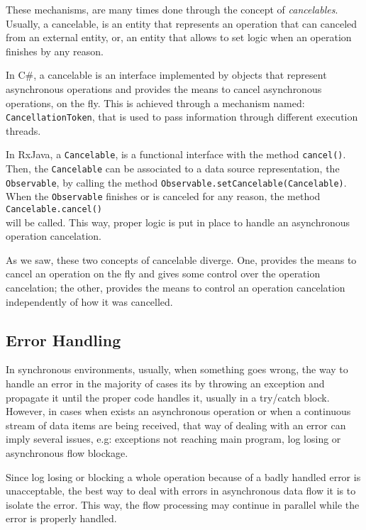 	These mechanisms, are many times done through the concept of \textit{cancelables}. 
	Usually, a cancelable, is an entity that represents an operation that can canceled from an external entity, or, an entity that allows to set logic when an operation finishes by any reason.
 
	In C\#, a cancelable is an interface implemented by objects that represent asynchronous operations and provides the means to cancel asynchronous operations, on the fly. 
	This is achieved through a mechanism named: \texttt{CancellationToken}, that is used to pass information through different execution threads. 
	
	In RxJava, a \texttt{Cancelable}, is a functional interface with the method \texttt{cancel()}. Then, the \texttt{Cancelable} can be associated to a data source representation, the \texttt{Observable}, by calling the method \texttt{Observable.setCancelable(Cancelable)}. 
	When the \texttt{Observable} finishes or is canceled for any reason, the method \texttt{Cancelable.cancel()}\\ will be called. 
	This way,  proper logic is put in place to handle an asynchronous operation cancelation.
	
	As we saw, these two concepts of cancelable diverge. One, provides the means to cancel an operation on the fly and gives some control over the operation cancelation; the other, provides the means to control an operation cancelation independently of how it was cancelled.
	
	\clearpage
	\subsection{Error Handling}  
	In synchronous environments, usually, when something goes wrong, the way to handle an error in the majority of cases its by throwing an exception and propagate it until the proper code handles it, usually  in a try/catch block. 
	However, in cases when exists an asynchronous operation or when a continuous stream of data items are being received, that way of dealing with an error can imply several issues, e.g: exceptions not reaching main program, log losing or asynchronous flow blockage. 
	
	Since log losing or blocking a whole operation because of a badly handled error is unacceptable, the best way to deal with errors in asynchronous data flow it is to isolate the error. This way, the flow processing may continue in parallel while the error is properly handled.
	
